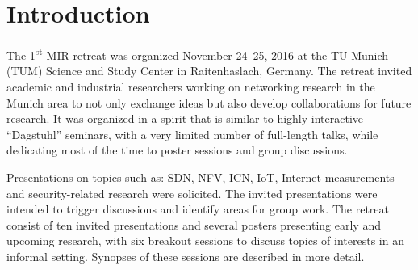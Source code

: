 \section{Introduction}\label{sec:introduction}


The 1\textsuperscript{st} \ac{MIR} retreat was organized November 24--25, 2016 at
the TU Munich (TUM) Science and Study Center in Raitenhaslach, Germany.  The retreat
invited academic and industrial researchers working on networking research in
the Munich area to not only exchange ideas but also develop collaborations
for future research.  It was organized in a spirit that is similar to
highly interactive ``Dagstuhl'' seminars, with a very limited number of
full-length talks, while dedicating most of the time to poster sessions and
group discussions.

Presentations on topics such as: \ac{SDN}, \ac{NFV}, \ac{ICN}, \ac{IoT},
Internet measurements and security-related research were solicited. The
invited presentations were intended to trigger discussions and identify areas
for group work. The retreat consist of ten invited presentations and several
posters presenting early and upcoming research, with six breakout sessions to
discuss topics of interests in an informal setting. Synopses of these
sessions are described in more detail.

